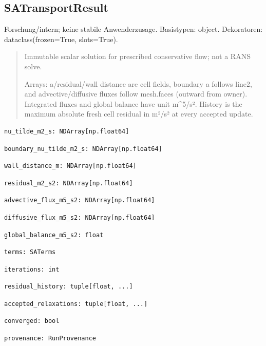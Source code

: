 \subsection{SATransportResult}
Forschung/intern; keine stabile Anwenderzusage.
Basistypen: object. Dekoratoren: dataclass(frozen=True, slots=True).
\begin{quote}
Immutable scalar solution for prescribed conservative flow; not a RANS solve.\par Arrays: a/residual/wall distance are cell fields, boundary a follows line2, and advective/diffusive fluxes follow mesh.faces (outward from owner). Integrated fluxes and global balance have unit m\textasciicircum{}5/s². History is the maximum absolute fresh cell residual in m²/s² at every accepted update.
\end{quote}
\begin{lstlisting}
nu_tilde_m2_s: NDArray[np.float64]
\end{lstlisting}
\begin{lstlisting}
boundary_nu_tilde_m2_s: NDArray[np.float64]
\end{lstlisting}
\begin{lstlisting}
wall_distance_m: NDArray[np.float64]
\end{lstlisting}
\begin{lstlisting}
residual_m2_s2: NDArray[np.float64]
\end{lstlisting}
\begin{lstlisting}
advective_flux_m5_s2: NDArray[np.float64]
\end{lstlisting}
\begin{lstlisting}
diffusive_flux_m5_s2: NDArray[np.float64]
\end{lstlisting}
\begin{lstlisting}
global_balance_m5_s2: float
\end{lstlisting}
\begin{lstlisting}
terms: SATerms
\end{lstlisting}
\begin{lstlisting}
iterations: int
\end{lstlisting}
\begin{lstlisting}
residual_history: tuple[float, ...]
\end{lstlisting}
\begin{lstlisting}
accepted_relaxations: tuple[float, ...]
\end{lstlisting}
\begin{lstlisting}
converged: bool
\end{lstlisting}
\begin{lstlisting}
provenance: RunProvenance
\end{lstlisting}
